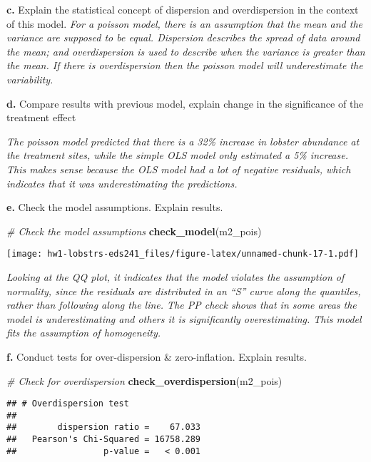 \documentclass[
]{article}
\newenvironment{Shaded}{\begin{snugshade}}{\end{snugshade}}
\newcommand{\CommentTok}[1]{\textcolor[rgb]{0.56,0.35,0.01}{\textit{#1}}}
\newcommand{\FunctionTok}[1]{\textcolor[rgb]{0.13,0.29,0.53}{\textbf{#1}}}
\newcommand{\NormalTok}[1]{#1}
\begin{document}
\textbf{c.} Explain the statistical concept of dispersion and
overdispersion in the context of this model. \emph{For a poisson model,
there is an assumption that the mean and the variance are supposed to be
equal. Dispersion describes the spread of data around the mean; and
overdispersion is used to describe when the variance is greater than the
mean. If there is overdispersion then the poisson model will
underestimate the variability.}

\textbf{d.} Compare results with previous model, explain change in the
significance of the treatment effect

\emph{The poisson model predicted that there is a 32\% increase in
lobster abundance at the treatment sites, while the simple OLS model
only estimated a 5\% increase. This makes sense because the OLS model
had a lot of negative residuals, which indicates that it was
underestimating the predictions.}

\textbf{e.} Check the model assumptions. Explain results.

\begin{Shaded}
\begin{Highlighting}[]
\CommentTok{\# Check the model assumptions}
\FunctionTok{check\_model}\NormalTok{(m2\_pois)}
\end{Highlighting}
\end{Shaded}

\texttt{[image: hw1-lobstrs-eds241\_files/figure-latex/unnamed-chunk-17-1.pdf]}

\emph{Looking at the QQ plot, it indicates that the model violates the
assumption of normality, since the residuals are distributed in an ``S''
curve along the quantiles, rather than following along the line. The PP
check shows that in some areas the model is underestimating and others
it is significantly overestimating. This model fits the assumption of
homogeneity. }

\textbf{f.} Conduct tests for over-dispersion \& zero-inflation. Explain
results.

\begin{Shaded}
\begin{Highlighting}[]
\CommentTok{\# Check for overdispersion}
\FunctionTok{check\_overdispersion}\NormalTok{(m2\_pois)}
\end{Highlighting}
\end{Shaded}

\begin{verbatim}
## # Overdispersion test
## 
##        dispersion ratio =    67.033
##   Pearson's Chi-Squared = 16758.289
##                 p-value =   < 0.001
\end{verbatim}
\end{document}
